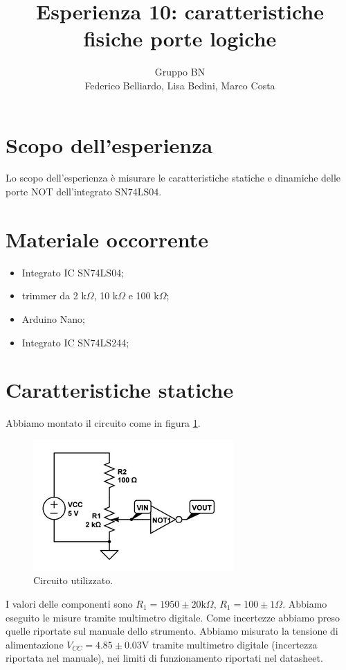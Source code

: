 \documentclass[10pt,a4paper]{article}
\author{Gruppo BN \\ Federico Belliardo, Lisa Bedini, Marco Costa}
\title{Esperienza 10: caratteristiche fisiche porte logiche}
\begin{document}
\maketitle

\section{Scopo dell'esperienza}
Lo scopo dell'esperienza è misurare le caratteristiche statiche e dinamiche delle porte NOT dell'integrato SN74LS04.

\section{Materiale occorrente}
\begin{itemize}
\item Integrato IC SN74LS04;
\item trimmer da 2 k$\Omega$, 10 k$\Omega$ e 100 k$\Omega$;
\item Arduino Nano;
\item Integrato IC SN74LS244;
\end{itemize}

\section{Caratteristiche statiche}
Abbiamo montato il circuito come in figura \ref{fig:circuito}.
\begin{figure}[!htb]
\centering
\includegraphics[scale=1.0]{circuito.png}
\caption{Circuito utilizzato.\label{fig:circuito}}
\end{figure}
I valori delle componenti sono $R_1 = 1950\pm 20\mbox{k}\Omega$,
$R_1=100\pm 1 \Omega$. Abbiamo eseguito le misure tramite multimetro digitale. Come incertezze abbiamo preso quelle riportate sul manuale dello strumento.
Abbiamo misurato la tensione di alimentazione $V_{CC}=4.85\pm 0.03$V tramite multimetro digitale (incertezza riportata nel manuale), nei limiti di funzionamento riportati nel datasheet.
\end{document}
